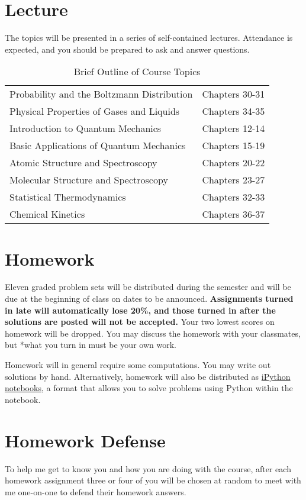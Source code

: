 \documentclass[11pt]{article}
\begin{document}
\section{Lecture}
\label{sec:org5a6bf75}
The topics will be presented in a series of self-contained
lectures. Attendance is expected, and you should be prepared to ask
and answer questions.  

\begin{table}[htbp]
\caption{Brief Outline of Course Topics}
\centering
\begin{tabular}{ll}
\hline
Probability and the Boltzmann Distribution & Chapters 30-31\\
Physical Properties of Gases and Liquids & Chapters 34-35\\
Introduction to Quantum Mechanics & Chapters 12-14\\
Basic Applications of Quantum Mechanics & Chapters 15-19\\
Atomic Structure and Spectroscopy & Chapters 20-22\\
Molecular Structure and Spectroscopy & Chapters 23-27\\
Statistical Thermodynamics & Chapters 32-33\\
Chemical Kinetics & Chapters 36-37\\
\hline
\end{tabular}
\end{table}

\section{Homework}
\label{sec:orgbae9788}
Eleven graded problem sets will be distributed during the semester and will be due at the beginning of class on dates to be announced.  \textbf{Assignments turned in late will automatically lose 20\%, and those turned in after the solutions are posted will not be accepted.}  Your two lowest scores on homework will be dropped.  You may discuss the homework with your classmates, but *what you turn in must be your own work.

Homework will in general require some computations. You may write out solutions by hand. Alternatively, homework will also be distributed as \href{https://ipython.org/notebook.html}{iPython notebooks}, a format that allows you to solve problems using Python within the notebook.
\section{Homework Defense}
\label{sec:orgcb346b3}
To help me get to know you and how you are doing with the course, after each homework assignment three or four of you will be chosen at random to meet with me one-on-one to defend their homework answers.
\end{document}
